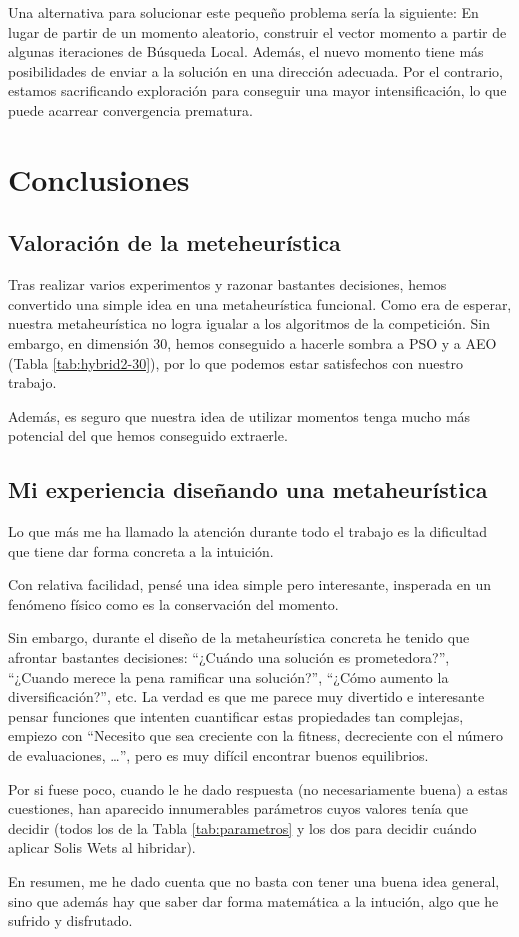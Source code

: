 \documentclass{article}
\begin{document}
Una alternativa para solucionar este pequeño problema sería la siguiente: En lugar de partir de un momento aleatorio, construir el
 vector momento a partir de algunas iteraciones de Búsqueda Local. Además, el nuevo momento tiene más posibilidades de enviar a la
 solución en una dirección adecuada. Por el contrario, estamos sacrificando exploración para conseguir una mayor intensificación,
 lo que puede acarrear convergencia prematura.

\section{Conclusiones}

\subsection{Valoración de la meteheurística}

Tras realizar varios experimentos y razonar bastantes decisiones, hemos convertido una simple idea en una metaheurística
funcional. Como era de esperar, nuestra metaheurística no logra igualar a los algoritmos de la competición. Sin embargo, en
dimensión 30, hemos conseguido a hacerle sombra a PSO y a AEO (Tabla \ref{tab:hybrid2-30}), por lo que podemos estar satisfechos
con nuestro trabajo.

Además, es seguro que nuestra idea de utilizar momentos tenga mucho más potencial del que hemos conseguido extraerle.

\subsection{Mi experiencia diseñando una metaheurística}

Lo que más me ha llamado la atención durante todo el trabajo es la dificultad que tiene dar forma concreta a la intuición.

Con relativa facilidad, pensé una idea simple pero interesante, insperada en un fenómeno físico como es la conservación del momento.

Sin embargo, durante el diseño de la metaheurística concreta he tenido que afrontar bastantes decisiones: ``¿Cuándo una solución es prometedora?'', ``¿Cuando merece la pena ramificar una solución?'', ``¿Cómo aumento la diversificación?'', etc. La verdad es que me parece muy divertido e interesante pensar
 funciones que intenten cuantificar estas propiedades tan complejas, empiezo con ``Necesito que sea creciente con la fitness, decreciente
 con el número de evaluaciones, \ldots'', pero es muy difícil encontrar buenos equilibrios.

Por si fuese poco, cuando le he dado respuesta (no necesariamente buena) a estas cuestiones, han aparecido innumerables parámetros cuyos
valores tenía que decidir (todos los de la Tabla \ref{tab:parametros} y los dos para decidir cuándo aplicar Solis Wets al hibridar).

En resumen, me he dado cuenta que no basta con tener una buena idea general, sino que además hay que saber dar forma matemática a la intución,
algo que he sufrido y disfrutado.
\end{document}
